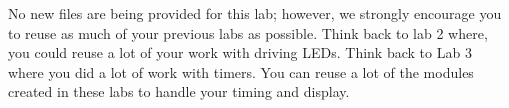 No new files are being provided for this lab; however, we strongly encourage you to reuse as much of your previous labs as possible. Think back to lab 2 where, you could reuse a lot of your work with driving LEDs. Think back to Lab 3 where you did a lot of work with timers. You can reuse a lot of the modules created in these labs to handle your timing and display. 